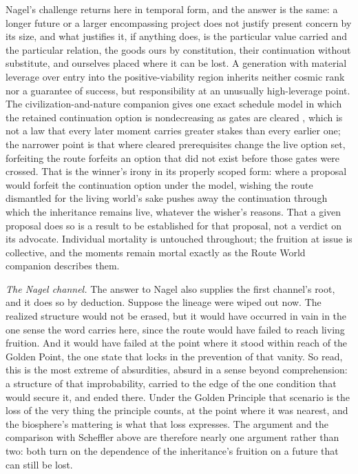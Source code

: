 Nagel's challenge returns here in temporal form, and the answer is the same:
a longer future or a larger encompassing project does not justify present
concern by its size, and what justifies it, if anything does, is the
particular value carried and the particular relation, the goods ours by
constitution, their continuation without substitute, and ourselves placed
where it can be lost. A generation with material leverage over entry into the
positive-viability region inherits neither cosmic rank nor a guarantee of
success, but responsibility at an unusually high-leverage point. The
civilization-and-nature companion gives one exact schedule model in which the
retained continuation option is nondecreasing as gates are cleared
\cite{GoldenCivNature}, which is not a law that every later moment carries
greater stakes than every earlier one; the narrower point is that where
cleared prerequisites change the live option set, forfeiting the route
forfeits an option that did not exist before those gates were crossed. That is the winner's irony in its
properly scoped form: where a proposal would forfeit the continuation option
under the model, wishing the route dismantled for the living world's sake
pushes away the continuation through which the inheritance remains live,
whatever the wisher's reasons. That a given proposal does so is a result to be
established for that proposal, not a verdict on its advocate. Individual mortality is untouched
throughout; the fruition at issue is collective, and the moments remain mortal
exactly as the Route World companion describes them.

\emph{The Nagel channel.} The answer to Nagel also supplies the first
channel's root, and it does so by deduction. Suppose the lineage were wiped
out now. The realized structure would not be erased, but it would have
occurred in vain in the one sense the word carries here, since the route would
have failed to reach living fruition. And it would have failed at the point
where it stood within reach of the Golden Point, the one state that locks in
the prevention of that vanity. So read, this is the most
extreme of absurdities, absurd in a sense beyond comprehension: a structure
of that improbability, carried to the edge of the one condition that would
secure it, and ended there. Under the Golden Principle that scenario is the loss of
the very thing the principle counts, at the point where it was nearest, and
the biosphere's mattering is what that loss expresses. The argument and the
comparison with Scheffler above are therefore nearly one argument rather than
two: both turn on the dependence of the inheritance's fruition on a future
that can still be lost.

